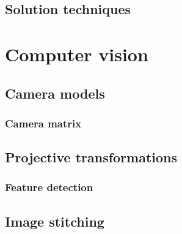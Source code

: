 		\subsection{Solution techniques}

	\section{Computer vision}
		\subsection{Camera models}
			\subsubsection{Camera matrix}
		\subsection{Projective transformations}
			\subsubsection{Feature detection}
		\subsection{Image stitching}
